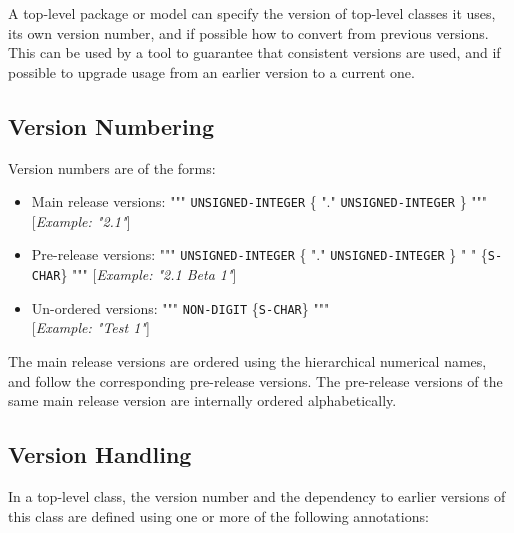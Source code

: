 A top-level package or model can specify the version of top-level
classes it uses, its own version number, and if possible how to convert
from previous versions. This can be used by a tool to guarantee that
consistent versions are used, and if possible to upgrade usage from an
earlier version to a current one.

\subsection{Version Numbering}

Version numbers are of the forms:

\begin{itemize}
\item
  Main release versions: """ \lstinline!UNSIGNED-INTEGER! \{ "." \lstinline!UNSIGNED-INTEGER! \}
  """ {[}\emph{Example: "2.1"}{]}
\item
  Pre-release versions: """ \lstinline!UNSIGNED-INTEGER! \{ "." \lstinline!UNSIGNED-INTEGER! \}
  " " \{\lstinline!S-CHAR!\} """ {[}\emph{Example: "2.1 Beta 1"}{]}
\item
  Un-ordered versions: """ \lstinline!NON-DIGIT! \{\lstinline!S-CHAR!\} """\\
  {[}\emph{Example: "Test 1"}{]}
\end{itemize}

The main release versions are ordered using the hierarchical numerical
names, and follow the corresponding pre-release versions. The
pre-release versions of the same main release version are internally
ordered alphabetically.

\subsection{Version Handling}

In a top-level class, the version number and the dependency to earlier
versions of this class are defined using one or more of the following
annotations:

